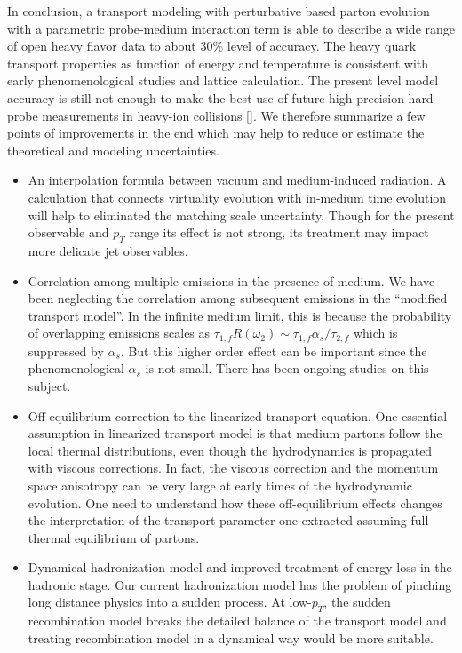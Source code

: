 In conclusion, a transport modeling with perturbative based parton evolution with a parametric probe-medium interaction term is able to describe a wide range of open heavy flavor data to about 30\% level of accuracy.
The heavy quark transport properties as function of energy and temperature is consistent with early phenomenological studies and lattice calculation.
The present level model accuracy is still not enough to make the best use of future high-precision hard probe measurements in heavy-ion collisions []. 
We therefore summarize a few points of improvements in the end which may help to reduce or estimate the theoretical and modeling uncertainties.
\begin{itemize}
\item An interpolation formula between vacuum and medium-induced radiation. A calculation that connects virtuality evolution with in-medium time evolution will help to eliminated the matching scale uncertainty. Though for the present observable and $p_T$ range its effect is not strong, its treatment may impact more delicate jet observables.
\item Correlation among multiple emissions in the presence of medium. We have been neglecting the correlation among subsequent emissions in the ``modified transport model''. In the infinite medium limit, this is because the probability of overlapping emissions scales as $\tau_{1,f} R(\omega_2) \sim \tau_{1,f} \alpha_s/\tau_{2,f}$ which is suppressed by $\alpha_s$. But this higher order effect can be important since the phenomenological $\alpha_s$ is not small. There has been ongoing studies on this subject.
\item Off equilibrium correction to the linearized transport equation. One essential assumption in linearized transport model is that medium partons follow the local thermal distributions, even though the hydrodynamics is propagated with viscous corrections. In fact, the viscous correction and the momentum space anisotropy can be very large at early times of the hydrodynamic evolution. One need to understand how these off-equilibrium effects changes the interpretation of the transport parameter one extracted assuming full thermal equilibrium of partons.
\item Dynamical hadronization model and improved treatment of energy loss in the hadronic stage.
Our current hadronization model has the problem of pinching long distance physics into a sudden process. 
At low-$p_T$, the sudden recombination model breaks the detailed balance of the transport model and treating recombination model in a dynamical way would be more suitable.

\end{itemize}
